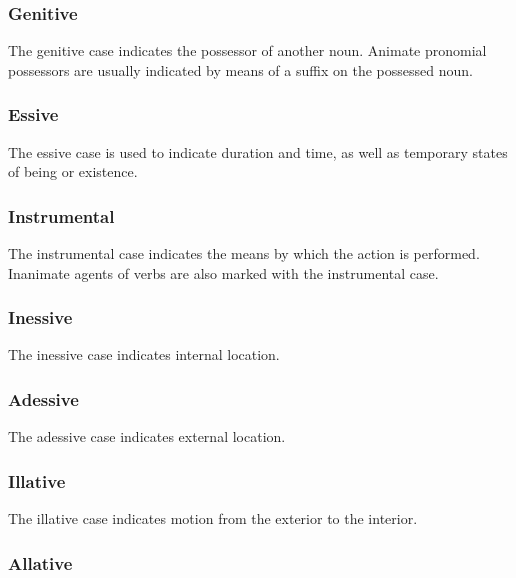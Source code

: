 \documentclass[grammar]{subfiles}
\begin{document}
\subsubsection{Genitive}
\label{sssec:ns_genitive_case}

The genitive case indicates the possessor of another noun.  Animate pronomial
possessors are usually indicated by means of a suffix on the possessed noun.


\subsubsection{Essive}
\label{sssec:ns_essive_case}

The essive case is used to indicate duration and time, as well as temporary
states of being or existence.  


\subsubsection{Instrumental}
\label{sssec:ns_instrumental_case}

The instrumental case indicates the means by which the action is
performed.  Inanimate agents of verbs are also marked with the instrumental case.  


\subsubsection{Inessive}
\label{sssec:ns_inessive_case}

The inessive case indicates internal location.  


\subsubsection{Adessive}
\label{sssec:ns_adessive_case}

The adessive case indicates external location.


\subsubsection{Illative}
\label{sssec:ns_illative_case}

The illative case indicates motion from the exterior to the interior.


\subsubsection{Allative}
\label{sssec:ns_allative_case}
\end{document}

